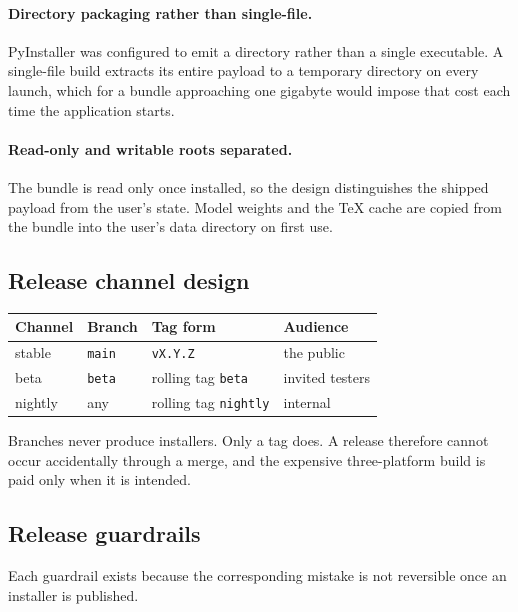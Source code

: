 \documentclass[11pt,a4paper]{article}
\begin{document}
\paragraph{Directory packaging rather than single-file.} PyInstaller was
configured to emit a directory rather than a single executable. A single-file
build extracts its entire payload to a temporary directory on every launch,
which for a bundle approaching one gigabyte would impose that cost each time the
application starts.

\paragraph{Read-only and writable roots separated.} The bundle is read only once
installed, so the design distinguishes the shipped payload from the user's
state. Model weights and the TeX cache are copied from the bundle into the
user's data directory on first use.

\subsection{Release channel design}

\begin{center}
\small
\begin{tabular}{@{}llll@{}}
\toprule
\textbf{Channel} & \textbf{Branch} & \textbf{Tag form} & \textbf{Audience} \\
\midrule
stable & \texttt{main} & \texttt{vX.Y.Z} & the public \\
beta & \texttt{beta} & rolling tag \texttt{beta} & invited testers \\
nightly & any & rolling tag \texttt{nightly} & internal \\
\bottomrule
\end{tabular}
\end{center}

Branches never produce installers. Only a tag does. A release therefore cannot
occur accidentally through a merge, and the expensive three-platform build is
paid only when it is intended.

\subsection{Release guardrails}

Each guardrail exists because the corresponding mistake is not reversible once
an installer is published.
\end{document}
